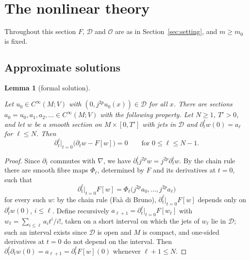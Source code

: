 \documentclass[11pt,reqno]{amsart}
\newtheorem{lemma}[theorem]{Lemma}
\theoremstyle{definition}
\theoremstyle{remark}
\newcommand{\Dom}{\mathcal{D}}
\newcommand{\Par}{\mathcal{O}}
\newcommand{\lean}[1]{}
\newcommand{\uses}[1]{}
\numberwithin{equation}{section}
\begin{document}
\section{The nonlinear theory}\label{sec:nonlinear}

Throughout this section $F$, $\Dom$ and $\Par$ are as in Section~\ref{sec:setting}, and $m\ge m_0$ is
fixed.

\subsection{Approximate solutions}

\begin{lemma}[formal solution]\label{lem:formal}
\lean{ShortTime.EquationData.formalCoeff, ShortTime.EquationData.formalCoeff_spec, ShortTime.EquationData.formalCoeff_spec', ShortTime.EquationData.formalPoly, ShortTime.EquationData.timeDerivIter_formalPoly, ShortTime.EquationData.exists_formalPoly_dom, ShortTime.EquationData.timeDerivIter_nonlinFamily_congr}
\uses{def:data}
Let $u_0\in C^\infty(M;V)$ with $(0,j^{2p}u_0(x))\in\Dom$ for all $x$. There are sections
$a_0=u_0,a_1,a_2,\ldots\in C^\infty(M;V)$ with the following property. Let $N\ge1$, $T'>0$, and let
$w$ be a smooth section on $M\times[0,T']$ with jets in $\Dom$ and $\partial_t^\ell w(0)=a_\ell$ for
$\ell\le N$. Then
\[
  \partial_t^\ell\big|_{t=0}\bigl(\partial_tw-F[w]\bigr)=0\qquad\text{for }0\le\ell\le N-1 .
\]
\end{lemma}

\begin{proof}
Since $\partial_t$ commutes with $\nabla$, we have $\partial_t^i j^{2p}w=j^{2p}\partial_t^iw$. By the
chain rule there are smooth fibre maps $\Phi_\ell$, determined by $F$ and its derivatives at $t=0$,
such that
\[
  \partial_t^\ell\big|_{t=0}F[w]=\Phi_\ell\bigl(j^{2p}a_0,\dots,j^{2p}a_\ell\bigr)
\]
for every such $w$: by the chain rule (Fa\`a di Bruno), $\partial_t^\ell|_{t=0}F[w]$ depends only on
$\partial_t^iw(0)$, $i\le\ell$. Define recursively $a_{\ell+1}=\partial_t^\ell|_{t=0}F[w_\ell]$ with
$w_\ell=\sum_{i\le\ell}a_it^i/i!$, taken on a short interval on which the jets of $w_\ell$ lie in $\Dom$;
such an interval exists since $\Dom$ is open and $M$ is compact, and one-sided derivatives at $t=0$ do
not depend on the interval. Then
$\partial_t^\ell\partial_tw(0)=a_{\ell+1}=\partial_t^\ell F[w](0)$ whenever $\ell+1\le N$.
\end{proof}
\end{document}
